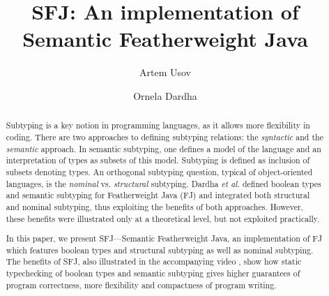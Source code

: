 \documentclass[runningheads]{llncs}
\begin{document}
\title{SFJ: An implementation of Semantic Featherweight Java
}

\author{Artem Usov \and Ornela Dardha}


\maketitle

\begin{abstract}
{Subtyping} is a key notion in programming languages, as it allows more flexibility in coding.
There are two approaches to defining subtyping relations: the \emph{syntactic} and the \emph{semantic} approach.
%
In semantic subtyping, one defines a model of the language and an interpretation of types as subsets of this model.
Subtyping is defined as inclusion of subsets denoting types.
%
An orthogonal subtyping question, typical of object-oriented languages, is the \emph{nominal} vs. \emph{structural} subtyping.
Dardha \emph{et al.} \cite{Dardha2013,Dardha2017} defined boolean types and semantic subtyping for Featherweight Java (FJ) and integrated both structural and nominal subtyping, thus exploiting the benefits of both approaches.
However, these benefits were illustrated only at a theoretical level, but not exploited practically.

In this paper, we present SFJ---Semantic Featherweight Java, an implementation of FJ which features boolean types and structural subtyping as well as nominal subtyping.
The benefits of SFJ, also illustrated in the accompanying video \cite{UD20}, show how static typechecking of boolean types and semantic subtyping gives higher guarantees of program correctness, more flexibility and compactness of program writing.
\end{abstract}
\end{document}
